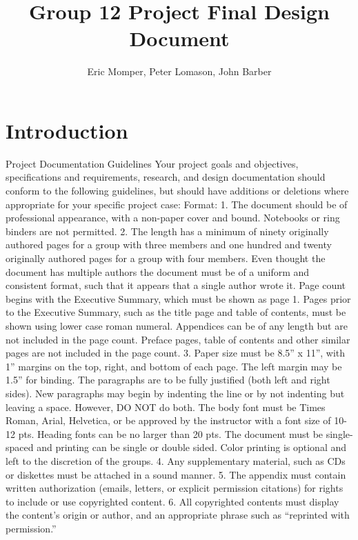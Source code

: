 \documentclass[a4paper,10pt]{article}
\title{Group 12 Project Final Design Document}
\author{Eric Momper, Peter Lomason, John Barber}
\begin{document}
	
	\maketitle
	
	\pagebreak
	\tableofcontents
	\pagebreak
	
	\section{Introduction}
Project Documentation Guidelines
Your project goals and objectives, specifications and requirements, research, and
design documentation should conform to the following guidelines, but should have
additions or deletions where appropriate for your specific project case:
Format:
1. The document should be of professional appearance, with a non-paper cover and
bound. Notebooks or ring binders are not permitted.
2. The length has a minimum of ninety originally authored pages for a group with
three members and one hundred and twenty originally authored pages for a group
with four members. Even thought the document has multiple authors the document
must be of a uniform and consistent format, such that it appears that a single
author wrote it. Page count begins with the Executive Summary, which must be
shown as page 1. Pages prior to the Executive Summary, such as the title page and
table of contents, must be shown using lower case roman numeral. Appendices can
be of any length but are not included in the page count. Preface pages, table of
contents and other similar pages are not included in the page count.
3. Paper size must be 8.5” x 11”, with 1” margins on the top, right, and bottom of
each page. The left margin may be 1.5” for binding. The paragraphs are to be fully
justified (both left and right sides). New paragraphs may begin by indenting the line
or by not indenting but leaving a space. However, DO NOT do both. The body font
must be Times Roman, Arial, Helvetica, or be approved by the instructor with a font
size of 10-12 pts. Heading fonts can be no larger than 20 pts. The document must be
single-spaced and printing can be single or double sided. Color printing is optional
and left to the discretion of the groups.
4. Any supplementary material, such as CDs or diskettes must be attached in a
sound manner.
5. The appendix must contain written authorization (emails, letters, or explicit
permission citations) for rights to include or use copyrighted content.
6. All copyrighted contents must display the content’s origin or author, and an
appropriate phrase such as “reprinted with permission.”
\end{document}

